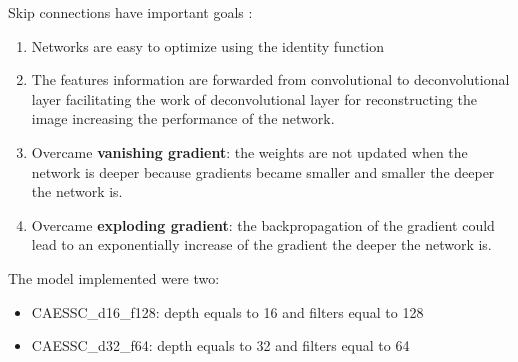 Skip connections have important goals \cite{resnet}:
\begin{enumerate}
    \item Networks are easy to optimize using the identity function
    \item The features information are forwarded from convolutional to deconvolutional layer facilitating the work of deconvolutional layer for reconstructing the image increasing the performance of the network.
    \item Overcame \textbf{vanishing gradient}: the weights are not updated when the network is deeper because gradients became smaller and smaller the deeper the network is.
    \item Overcame \textbf{exploding gradient}: the backpropagation of the gradient could lead to an exponentially increase of the gradient the deeper the network is.
\end{enumerate}

The model implemented were two:

\begin{itemize}
    \item CAESSC\_d16\_f128: depth equals to 16 and filters equal to 128
    \item CAESSC\_d32\_f64: depth equals to 32 and filters equal to 64
\end{itemize}

